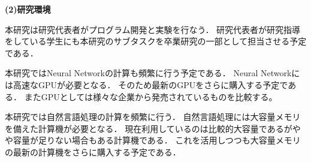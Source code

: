 \documentclass[11pt,a4j,dvipdfmx]{jarticle} 					%
\newcommand{\研究課題名}{人工知能のためのLispシステム}
\newcommand{\研究機関名}{大阪公立大学工業高等専門学校}
\newcommand{\研究代表者氏名}{新妻弘崇}
\newcommand{\研究期間の最終元号年度}{11}  %
\newcommand{\paper}[6]{%
	\item ``#1'', #2, #3 {\bf #4}, #5 (#6).			%
}
\newcommand{\etal}{\textit{et al.\ }}
\newcommand{\yukawa}{H.~Yukawa}					%
\newcommand{\prl}{Phys.\ Rev.\ Lett.\ }		%
\begin{document}



\vspace{0.5cm}
\noindent
\textbf{(2)研究環境}

本研究は研究代表者がプログラム開発と実験を行なう．
研究代表者が研究指導をしている学生にも本研究のサブタスクを卒業研究の一部として担当させる予定である．



本研究ではNeural Networkの計算も頻繁に行う予定である．
Neural Networkには高速なGPUが必要となる．
そのため最新のGPUをさらに購入する予定である．
またGPUとしては様々な企業から発売されているものを比較する。

本研究では自然言語処理の計算を頻繁に行う．
自然言語処理には大容量メモリを備えた計算機が必要となる．
現在利用しているのは比較的大容量であるがやや容量が足りない場合もある計算機である．
これを活用しつつも大容量メモリの最新の計算機をさらに購入する予定である．



				
				
		

		
\end{document}
